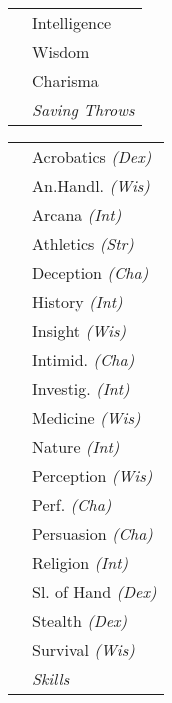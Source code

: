 \documentclass{article}
\begin{document}
\begin{minipage}{.3\textwidth}
\begin{minipage}{.58\textwidth}
\begin{tabularx}{\textwidth}{| L{.05} L{1.95} |}
      &Intelligence\\
      &Wisdom\\
      &Charisma\\
      &\textit{\footnotesize{Saving Throws}}\\\hline
    \end{tabularx}
    \begin{tabularx}{\textwidth}{| L{.05} L{1.95} |}
      \hline
      &\footnotesize{Acrobatics} \textit{\scriptsize{(Dex)}}\\
      &\footnotesize{An.Handl.} \textit{\scriptsize{(Wis)}}\\
      &\footnotesize{Arcana} \textit{\scriptsize{(Int)}}\\
      &\footnotesize{Athletics} \textit{\scriptsize{(Str)}}\\
      &\footnotesize{Deception} \textit{\scriptsize{(Cha)}}\\
      &\footnotesize{History} \textit{\scriptsize{(Int)}}\\
      &\footnotesize{Insight} \textit{\scriptsize{(Wis)}}\\
      &\footnotesize{Intimid.} \textit{\scriptsize{(Cha)}}\\
      &\footnotesize{Investig.} \textit{\scriptsize{(Int)}}\\
      &\footnotesize{Medicine} \textit{\scriptsize{(Wis)}}\\
      &\footnotesize{Nature} \textit{\scriptsize{(Int)}}\\
      &\footnotesize{Perception} \textit{\scriptsize{(Wis)}}\\
      &\footnotesize{Perf.} \textit{\scriptsize{(Cha)}}\\
      &\footnotesize{Persuasion} \textit{\scriptsize{(Cha)}}\\
      &\footnotesize{Religion} \textit{\scriptsize{(Int)}}\\
      &\footnotesize{Sl. of Hand} \textit{\scriptsize{(Dex)}}\\
      &\footnotesize{Stealth} \textit{\scriptsize{(Dex)}}\\
      &\footnotesize{Survival} \textit{\scriptsize{(Wis)}}\\
      &\textit{\footnotesize{Skills}}\\\hline
    \end{tabularx}
  \vspace{2em}
  \end{minipage}

\end{minipage}
\end{document}
